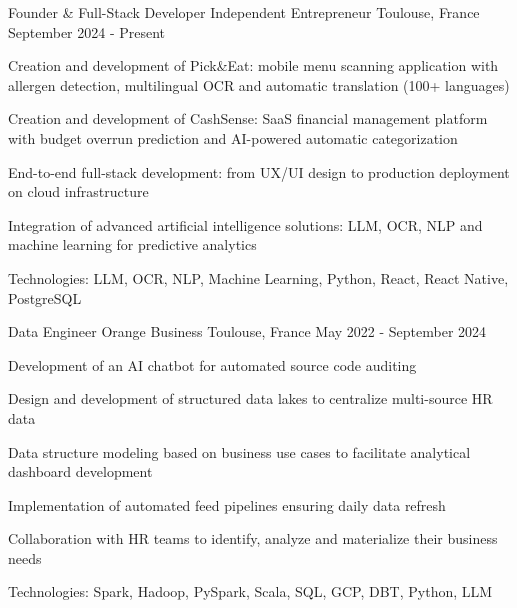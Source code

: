 


\begin{cventries}


\cventry
{Founder \& Full-Stack Developer} %
{Independent Entrepreneur} %
{Toulouse, France} %
{September 2024 - Present} %
{ %
\begin{cvitems}
\item {Creation and development of Pick\&Eat: mobile menu scanning application with allergen detection, multilingual OCR and automatic translation (100+ languages)}
\item {Creation and development of CashSense: SaaS financial management platform with budget overrun prediction and AI-powered automatic categorization}
\item {End-to-end full-stack development: from UX/UI design to production deployment on cloud infrastructure}
\item {Integration of advanced artificial intelligence solutions: LLM, OCR, NLP and machine learning for predictive analytics}
\item {Technologies: LLM, OCR, NLP, Machine Learning, Python, React, React Native, PostgreSQL}
\end{cvitems}
}

\vspace{1.5em}


\cventry
{Data Engineer} %
{Orange Business} %
{Toulouse, France} %
{May 2022 - September 2024} %
{ %
\begin{cvitems}
\item {Development of an AI chatbot for automated source code auditing}
\item {Design and development of structured data lakes to centralize multi-source HR data}
\item {Data structure modeling based on business use cases to facilitate analytical dashboard development}
\item {Implementation of automated feed pipelines ensuring daily data refresh}
\item {Collaboration with HR teams to identify, analyze and materialize their business needs}
\item {Technologies: Spark, Hadoop, PySpark, Scala, SQL, GCP, DBT, Python, LLM}
\end{cvitems}
}
\vspace{1.5em}


\end{cventries}
